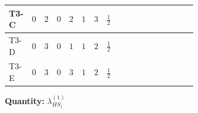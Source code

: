 \documentclass[8pt]{article}
\begin{document}
\begin{landscape}
\begin{longtable}{@{}llcccccc >{\raggedright\arraybackslash}p{0.21\linewidth} >{\raggedright\arraybackslash}p{0.21\linewidth} >{\raggedright\arraybackslash}p{0.21\linewidth}@{}}
\midrule
T3-C & $0$ & $2$ & $0$ & $2$ & $1$ & $3$ & $\frac{1}{2}$ & \scriptsize\adjustbox{max width=\linewidth}{$\begin{gathered} +6 {\lambda_1} {\lambda_{HS_1}^{(1)}}\end{gathered}$} & \scriptsize\adjustbox{max width=\linewidth}{$\begin{gathered} +4 {\lambda_{HS_1}^{(1)}}^2\end{gathered}$} & \scriptsize\adjustbox{max width=\linewidth}{$\begin{gathered} +6 {\lambda_{HS_1}^{(1)}} {\lambda_{S_1}^{(1)}}\end{gathered}$} \\
\midrule
T3-D & $0$ & $3$ & $0$ & $1$ & $1$ & $2$ & $\frac{1}{2}$ & \scriptsize\adjustbox{max width=\linewidth}{$\begin{gathered} +6 {\lambda_1} {\lambda_{HS_1}^{(1)}}\end{gathered}$} & \scriptsize\adjustbox{max width=\linewidth}{$\begin{gathered} +4 {\lambda_{HS_1}^{(1)}}^2\end{gathered}$} & \scriptsize\adjustbox{max width=\linewidth}{$\begin{gathered} +8 {\lambda_{HS_1}^{(1)}} {\lambda_{S_1}^{(1)}}\end{gathered}$} \\
\midrule
T3-E & $0$ & $3$ & $0$ & $3$ & $1$ & $2$ & $\frac{1}{2}$ & \scriptsize\adjustbox{max width=\linewidth}{$\begin{gathered} +6 {\lambda_1} {\lambda_{HS_1}^{(1)}}\end{gathered}$} & \scriptsize\adjustbox{max width=\linewidth}{$\begin{gathered} +4 {\lambda_{HS_1}^{(1)}}^2\end{gathered}$} & \scriptsize\adjustbox{max width=\linewidth}{$\begin{gathered} +8 {\lambda_{HS_1}^{(1)}} {\lambda_{S_1}^{(1)}}\end{gathered}$} \\
\midrule
\bottomrule
\end{longtable}
\clearpage
\noindent\textbf{Quantity: }$\lambda_{HS_1}^{(1)}$\par\smallskip

\end{landscape}
\end{document}
